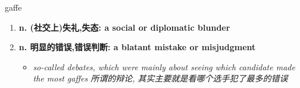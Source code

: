 
\begin{frame}
{\huge gaffe}
\begin{center}
\begin{enumerate}\Large
  \item \textbf{n. (社交上)失礼,失态: a social or diplomatic blunder}
  \item \textbf{n. 明显的错误,错误判断: a blatant mistake or misjudgment}
  \begin{itemize}
    \item \em{\Large{so-called debates, which were mainly about seeing which candidate made the most gaffes 所谓的辩论, 其实主要就是看哪个选手犯了最多的错误}}
  \end{itemize}
\end{enumerate}
\end{center}
\end{frame}

